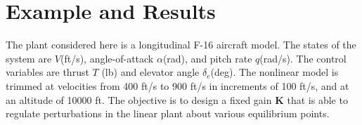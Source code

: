 \documentclass[letterpaper, 10 pt, conference]{ieeeconf}  %
\newcommand{\real}{\mathbb{R}}
\newcommand{\vo}[1]{\boldsymbol{#1}}
\begin{document}

\section{Example and Results}
The plant considered here is a longitudinal F-16 aircraft model. The states of the system are $V$(ft/s), angle-of-attack $\alpha$(rad), and pitch rate $q$(rad/s). The control variables are thrust $T$ (lb) and elevator angle $\delta_e$(deg). The nonlinear model is trimmed at velocities from 400 ft/s to 900 ft/s in increments of 100 ft/s, and at an altitude of 10000 ft.
The objective is to design a fixed gain $\vo{K}$ that is able to regulate perturbations in the linear plant about various equilibrium points.
\end{document}
